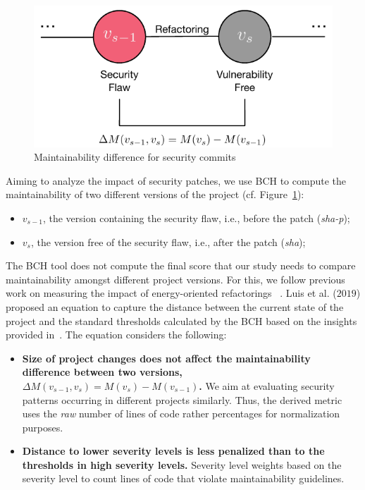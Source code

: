 \documentclass[10pt,conference]{IEEEtran}
\begin{document}
\begin{figure}[h]
 	\centering 	\includegraphics[width=0.6\linewidth]{figures/commit.pdf}
 	\caption{Maintainability difference for security commits}
	\label{fig:commit}
\end{figure}

Aiming to analyze the impact of security patches, we use BCH to compute the
maintainability of two different versions of the project (cf. Figure~\ref{fig:commit}):
\begin{itemize}
	\item $v_{s-1}$, the version containing the security flaw, i.e., before the
	patch (\emph{sha-p});
	\item $v_{s}$, the version free of the security flaw, i.e., after the
	patch (\emph{sha});
\end{itemize}

The BCH tool does not compute the final score that our study needs to compare
maintainability amongst different project versions. For this, we
follow previous work on measuring the impact of energy-oriented refactorings
~\cite{cruz2019energyoriented}. Luis et al. ($2019$) proposed an equation
to capture the distance between the current state of the project and
the standard thresholds calculated by the BCH based on the insights provided in~\cite{Olivari:2018}. 
The equation considers the following:
\begin{itemize}
	\item \textbf{Size of project changes does not affect the maintainability
	difference between two versions, $\Delta M (v_{s-1},v_{s}) = M(v_{s}) - M(v_{s-1})$.} We
	aim at evaluating security patterns occurring in different projects similarly.
	Thus, the derived metric uses the \textit{raw} number of lines of code rather
  percentages for normalization purposes.
	\item \textbf{Distance to lower severity levels is less penalized than to the
	thresholds in high severity levels.} Severity level weights based on the
	severity level to count lines of code that violate maintainability guidelines.
\end{itemize}
\end{document}
